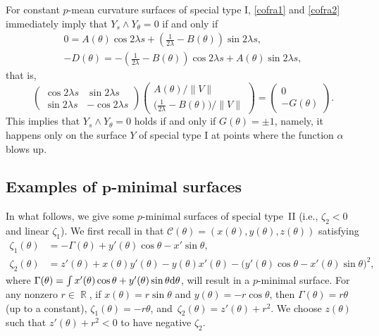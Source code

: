 \documentclass[pdftex]{sigma}
\numberwithin{equation}{section}
\DeclareMathOperator{\R}{\mathbb R}
\begin{document}
For constant $p$-mean curvature surfaces of special type I, \eqref{cofra1} and \eqref{cofra2} immediately imply that $Y_{s}\wedge Y_{\theta}=0$ if and only if
\begin{gather*}
0=A(\theta)\cos{2\lambda s}+\left(\frac{1}{2\lambda}-B(\theta)\right)\sin{2\lambda s},\\
-D(\theta)=-\left(\frac{1}{2\lambda}-B(\theta)\right)\cos{2\lambda s}+A(\theta)\sin{2\lambda s},
\end{gather*}
that is,
\[\left(\begin{matrix}
\cos{2\lambda s}&\sin{2\lambda s}\\\sin{2\lambda s}&-\cos{2\lambda s}
\end{matrix}\right)\left(\begin{matrix}A(\theta)/\|V\| \\ \bigl(\frac{1}{2\lambda}-B(\theta)\bigr)/\|V\|\end{matrix}\right)=\left(\begin{matrix}
0\\-G(\theta)\end{matrix}\right).\]
This implies that $Y_{s}\wedge Y_{\theta}=0$ holds if and only if $G(\theta)=\pm 1$, namely, it happens only on the surface $Y$ of special type I at points where the function $\alpha$ blows up.

\subsection[Examples of p-minimal surfaces]{Examples of $\boldsymbol{p}$-minimal surfaces}\label{section5.3}

In what follows, we give some $p$-minimal surfaces of special type~II (i.e., $\zeta_2<0$ and linear $\zeta_1$). We first recall in \cite{ChiuH/LiuH:2022} that $\mathcal C(\theta)=(x(\theta),y(\theta),z(\theta))$ satisfying
\begin{align*}%
\zeta_1(\theta)&=-\Gamma(\theta)+y'(\theta)\cos\theta-x'\sin\theta,\\
\zeta_2(\theta)&=z'(\theta)+x(\theta)y'(\theta)-y(\theta)x'(\theta)-\bigl(y'(\theta)\cos\theta-x'(\theta)\sin\theta\bigr)^2,
\end{align*}
where $\Gamma(\theta)=\int x'(\theta)\cos\theta+y'(\theta)\sin\theta {\rm d}\theta$, will result in a $p$-minimal surface. For any nonzero $r\in\R$, if $x(\theta)=r\sin\theta$ and $y(\theta)=-r\cos\theta$,
then $\Gamma(\theta)=r\theta$ (up to a constant), $\zeta_1(\theta)=-r\theta$, and~${\zeta_2(\theta)=z'(\theta)+r^2}$.
We choose $z(\theta)$ such that $z'(\theta)+r^2<0$ to have negative $\zeta_2$.
\end{document}

